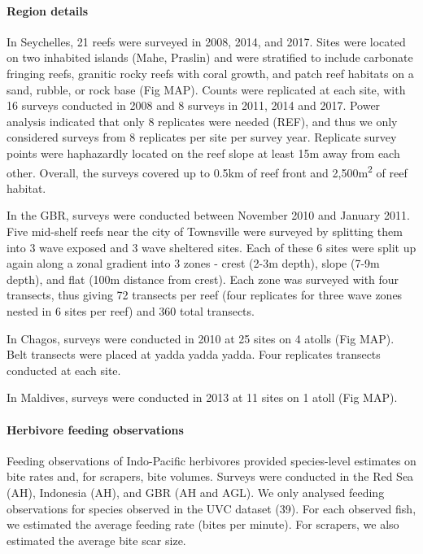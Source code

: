\documentclass[]{article}
\let\oldparagraph\paragraph
\renewcommand{\paragraph}[1]{\oldparagraph{#1}\mbox{}}
\begin{document}
\paragraph{Region details}\label{region-details}

In Seychelles, 21 reefs were surveyed in 2008, 2014, and 2017. Sites
were located on two inhabited islands (Mahe, Praslin) and were
stratified to include carbonate fringing reefs, granitic rocky reefs
with coral growth, and patch reef habitats on a sand, rubble, or rock
base (Fig MAP). Counts were replicated at each site, with 16 surveys
conducted in 2008 and 8 surveys in 2011, 2014 and 2017. Power analysis
indicated that only 8 replicates were needed (REF), and thus we only
considered surveys from 8 replicates per site per survey year. Replicate
survey points were haphazardly located on the reef slope at least 15m
away from each other. Overall, the surveys covered up to 0.5km of reef
front and 2,500m\textsuperscript{2} of reef habitat.

In the GBR, surveys were conducted between November 2010 and January
2011. Five mid-shelf reefs near the city of Townsville were surveyed by
splitting them into 3 wave exposed and 3 wave sheltered sites. Each of
these 6 sites were split up again along a zonal gradient into 3 zones -
crest (2-3m depth), slope (7-9m depth), and flat (100m distance from
crest). Each zone was surveyed with four transects, thus giving 72
transects per reef (four replicates for three wave zones nested in 6
sites per reef) and 360 total transects.

In Chagos, surveys were conducted in 2010 at 25 sites on 4 atolls (Fig
MAP). Belt transects were placed at yadda yadda yadda. Four replicates
transects conducted at each site.

In Maldives, surveys were conducted in 2013 at 11 sites on 1 atoll (Fig
MAP).

\paragraph{Herbivore feeding
observations}\label{herbivore-feeding-observations}

Feeding observations of Indo-Pacific herbivores provided species-level
estimates on bite rates and, for scrapers, bite volumes. Surveys were
conducted in the Red Sea (AH), Indonesia (AH), and GBR (AH and AGL). We
only analysed feeding observations for species observed in the UVC
dataset (39). For each observed fish, we estimated the average feeding
rate (bites per minute). For scrapers, we also estimated the average
bite scar size.
\end{document}
